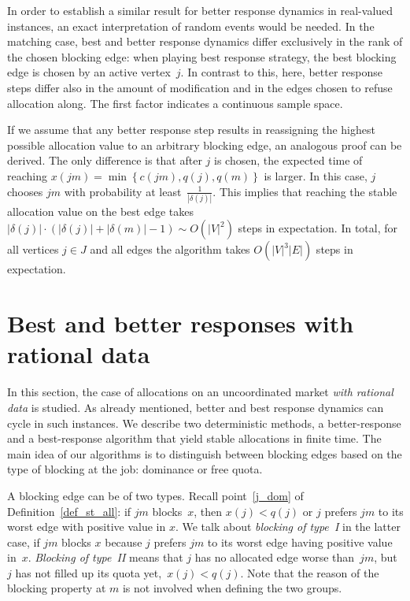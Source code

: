 \documentclass{llncs}
\begin{document}
In order to establish a similar result for better response dynamics in real-valued instances, an exact interpretation of random events would be needed. In the matching case, best and better response dynamics differ exclusively in the rank of the chosen blocking edge: when playing best response strategy, the best blocking edge is chosen by an active vertex~$j$. In contrast to this, here, better response steps differ also in the amount of modification and in the edges chosen to refuse allocation along. The first factor indicates a continuous sample space.

If we assume that any better response step results in reassigning the highest possible allocation value to an arbitrary blocking edge, an analogous proof can be derived. The only difference is that after $j$ is chosen, the expected time of reaching $x(jm)=\min{\left\{c(jm), q(j), q(m)\right\}}$ is larger. In this case, $j$ chooses $jm$ with probability at least~$\frac{1}{|\delta(j)|}$. This implies that reaching the stable allocation value on the best edge takes $|\delta(j)| \cdot (|\delta(j)|+|\delta(m)|-1) \sim O(|V|^2)$ steps in expectation. In total, for all vertices $j \in J$ and all edges the algorithm takes $O(|V|^3 |E|)$ steps in expectation.



\section{Best and better responses with rational data}
\label{sec:rat}

In this section, the case of allocations on an uncoordinated market \emph{with rational data} is studied. As already mentioned, better and best response dynamics can cycle in such instances. We describe two deterministic methods, a better-response and a best-response algorithm that yield stable allocations in finite time. The main idea of our algorithms is to distinguish between blocking edges based on the type of blocking at the job: dominance or free quota.

A blocking edge can be of two types. Recall point~\ref{j_dom} of Definition~\ref{def_st_all}: if $jm$ blocks~$x$, then $x(j) < q(j)$ or $j$ prefers $jm$ to its worst edge with positive value in $x$. We talk about \emph{blocking of type~I} in the latter case, if $jm$ blocks $x$ because $j$ prefers $jm$ to its worst edge having positive value in~$x$. \emph{Blocking of type~II} means that $j$ has no allocated edge worse than~$jm$, but $j$ has not filled up its quota yet,~$x(j) < q(j)$. Note that the reason of the blocking property at $m$ is not involved when defining the two groups.
\end{document}
